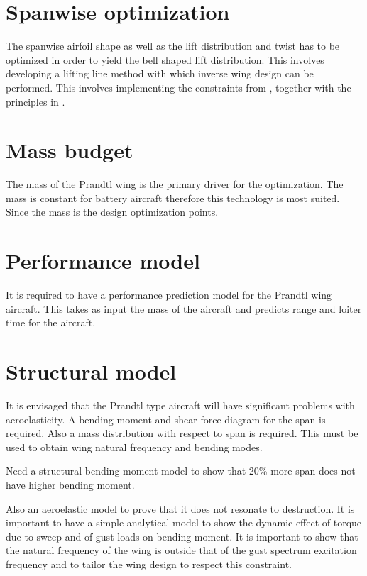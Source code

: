 \documentclass{report}
\begin{document}
\section{Spanwise optimization}


The spanwise airfoil shape as well as the lift distribution and twist has to be optimized in order to yield the bell shaped lift distribution.  This involves developing a lifting line method with which inverse wing design can be performed.  This involves implementing the constraints from \cite{Prandtl1933}, together with the principles in \cite{PrandtlBowers}.

\section{Mass budget}

The mass of the Prandtl wing is the primary driver for the optimization.  The mass is constant for battery aircraft therefore this technology is most suited.  Since the mass is the design optimization points.

\section{Performance model}

It is required to have a performance prediction model for the Prandtl wing aircraft.  This takes as input the mass of the aircraft and predicts range and loiter time for the aircraft.


\section{Structural model}

It is envisaged that the Prandtl type aircraft will have significant problems with aeroelasticity.  A bending moment and shear force diagram for the span is required.  Also a mass distribution with respect to span is required.  This must be used to obtain wing natural frequency and bending modes.

Need a structural bending moment model to show that 20\% more span does not have higher bending moment. 

Also an aeroelastic model to prove that it does not resonate to destruction.  It is important to have a simple analytical model to show the dynamic effect of torque due to sweep and of gust loads on bending moment.  It is important to show that the natural frequency of the wing is outside that of the gust spectrum excitation frequency and to tailor the wing design to respect this constraint.
\end{document}
